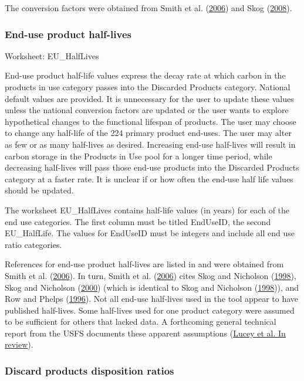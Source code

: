 \documentclass[
  openany]{book}
\begin{document}
The conversion factors were obtained from Smith et al.
(\protect\hyperlink{ref-smith2006}{2006}) and Skog
(\protect\hyperlink{ref-skog2008}{2008}).

\hypertarget{own-prov-input-euhl}{%
\subsubsection{End-use product half-lives}\label{own-prov-input-euhl}}

Worksheet: EU\_HalfLives

End-use product half-life values express the decay rate at which carbon
in the products in use category passes into the Discarded Products
category. National default values are provided. It is unnecessary for
the user to update these values unless the national conversion factors
are updated or the user wants to explore hypothetical changes to the
functional lifespan of products. The user may choose to change any
half-life of the 224 primary product end-uses. The user may alter as few
or as many half-lives as desired. Increasing end-use half-lives will
result in carbon storage in the Products in Use pool for a longer time
period, while decreasing half-lives will pass those end-use products
into the Discarded Products category at a faster rate. It is unclear if
or how often the end-use half life values should be updated.

The worksheet EU\_HalfLives contains half-life values (in years) for
each of the end use categories. The first column must be titled
EndUseID, the second EU\_HalfLife. The values for EndUseID must be
integers and include all end use ratio categories.

References for end-use product half-lives are listed in and were
obtained from Smith et al. (\protect\hyperlink{ref-smith2006}{2006}). In
turn, Smith et al. (\protect\hyperlink{ref-smith2006}{2006}) cites Skog
and Nicholson (\protect\hyperlink{ref-skog1998}{1998}), Skog and
Nicholson (\protect\hyperlink{ref-skog2000}{2000}) (which is identical
to Skog and Nicholson (\protect\hyperlink{ref-skog1998}{1998})), and Row
and Phelps (\protect\hyperlink{ref-row1996}{1996}). Not all end-use
half-lives used in the tool appear to have published half-lives. Some
half-lives used for one product category were assumed to be sufficient
for others that lacked data. A forthcoming general technical report from
the USFS documents these apparent assumptions
(\protect\hyperlink{ref-lucey202X}{Lucey et al. In review}).

\hypertarget{own-prov-input-discFates}{%
\subsubsection{Discard products disposition
ratios}\label{own-prov-input-discFates}}
\end{document}
